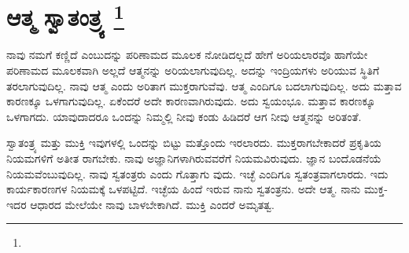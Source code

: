 
\chapter[ಆತ್ಮ ಸ್ವಾತಂತ್ರ್ಯ ]{ಆತ್ಮ ಸ್ವಾತಂತ್ರ್ಯ \protect\footnote{}}

ನಾವು ನಮಗೆ ಕಣ್ಣಿದೆ ಎಂಬುದನ್ನು ಪರಿಣಾಮದ ಮೂಲಕ ನೋಡಿದಲ್ಲದೆ ಹೇಗೆ ಅರಿಯಲಾರವೊ ಹಾಗೆಯೇ ಪರಿಣಾಮದ ಮೂಲಕವಾಗಿ ಅಲ್ಲದೆ ಆತ್ಮನನ್ನು ಅರಿಯಲಾಗುವುದಿಲ್ಲ. ಅದನ್ನು ಇಂದ್ರಿಯಗಳು ಅರಿಯುವ ಸ್ಥಿತಿಗೆ ತರಲಾಗುವುದಿಲ್ಲ. ನಾವು ಆತ್ಮ ಎಂದು ಅರಿತಾಗ ಮುಕ್ತರಾಗುವೆವು. ಆತ್ಮ ಎಂದಿಗೂ ಬದಲಾಗುವುದಿಲ್ಲ. ಅದು ಮತ್ತಾವ ಕಾರಣಕ್ಕೂ ಒಳಗಾಗುವುದಿಲ್ಲ. ಏಕೆಂದರೆ ಅದೇ ಕಾರಣವಾಗಿರುವುದು. ಅದು ಸ್ವಯಂಭೂ. ಮತ್ತಾವ ಕಾರಣಕ್ಕೂ ಒಳಗಾಗದು. ಯಾವುದಾದರೂ ಒಂದನ್ನು ನಿಮ್ಮಲ್ಲಿ ನೀವು ಕಂಡು ಹಿಡಿದರೆ ಆಗ ನೀವು ಆತ್ಮನನ್ನು ಅರಿತಂತೆ.

ಸ್ವಾತಂತ್ರ್ಯ ಮತ್ತು ಮುಕ್ತಿ ಇವುಗಳಲ್ಲಿ ಒಂದನ್ನು ಬಿಟ್ಟು ಮತ್ತೊಂದು ಇರಲಾರದು. ಮುಕ್ತರಾಗಬೇಕಾದರೆ ಪ್ರಕೃತಿಯ ನಿಯಮಗಳಿಗೆ ಅತೀತ ರಾಗಬೇಕು. ನಾವು ಅಜ್ಞಾನಿಗಳಾಗಿರುವವರೆಗೆ ನಿಯಮವಿರುವುದು. ಜ್ಞಾನ ಬಂದೊಡನೆಯೆ ನಿಯಮವೆಂಬುವುದಿಲ್ಲ. ನಾವು ಸ್ವತಂತ್ರರು ಎಂದು ಗೊತ್ತಾಗು ವುದು. ಇಚ್ಛೆ ಎಂದಿಗೂ ಸ್ವತಂತ್ರವಾಗಲಾರದು. ಇದು ಕಾರ್ಯಕಾರಣಗಳ ನಿಯಮಕ್ಕೆ ಒಳಪಟ್ಟಿದೆ. ಇಚ್ಛೆಯ ಹಿಂದೆ ಇರುವ ನಾನು ಸ್ವತಂತ್ರನು. ಅದೇ ಆತ್ಮ. ನಾನು ಮುಕ್ತ-ಇದರ ಆಧಾರದ ಮೇಲೆಯೇ ನಾವು ಬಾಳಬೇಕಾಗಿದೆ. ಮುಕ್ತಿ ಎಂದರೆ ಅಮೃತತ್ವ.

